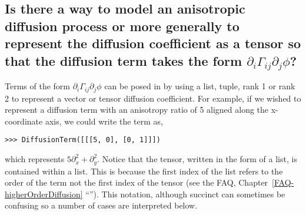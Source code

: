           \subsection{Is there a way to model an anisotropic diffusion
            process or more generally to represent the diffusion
            coefficient as a tensor so that the diffusion term takes the
            form $\partial_i \Gamma_{ij}\partial_j \phi$?}
          Terms of the form $\partial_i \Gamma_{ij}\partial_j \phi$ can
          be posed in \FiPy{} by using a list, tuple, rank 1 or rank 2
           to represent a vector or tensor diffusion
          coefficient.  For example, if we wished to represent a
          diffusion term with an anisotropy ratio of 5 aligned along the
          x-coordinate axis, we could write the term as,
\begin{verbatim}
>>> DiffusionTerm([[[5, 0], [0, 1]]])
\end{verbatim}
          which represents $5 \partial_x^2 + \partial_y^2$.  Notice that
          the tensor, written in the form of a list, is contained within
          a list. This is because the first index of the list refers to
          the order of the term not the first index of the tensor (see
          the FAQ, Chapter~\ref{FAQ-higherOrderDiffusion}
          ``''). This
          notation, although succinct can sometimes be confusing so a
          number of cases are interpreted below.
